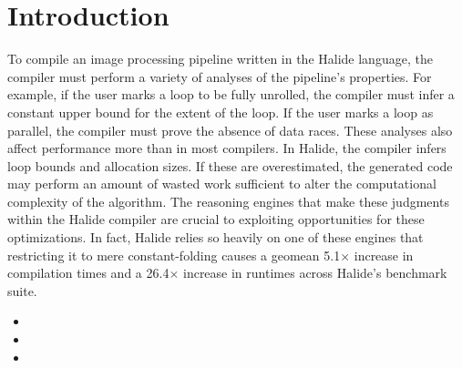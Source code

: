 \chapter{Introduction}
\label{sec:intro}


To compile an image processing pipeline written in the
  Halide language, the compiler must perform a variety of analyses of
  the pipeline's properties. For example, if the user marks a
  loop to be fully unrolled, the compiler must infer a constant upper
  bound for the extent of the loop. If the user marks
  a loop as parallel, the compiler must prove the absence of data
  races. These analyses also affect performance more than in most
  compilers. In Halide, the compiler infers loop bounds and allocation sizes.
  If these are overestimated, the generated code may
  perform an amount of wasted work sufficient to alter the
  computational complexity of the algorithm. The reasoning engines that make these judgments within the Halide compiler are crucial to exploiting opportunities for these optimizations.
  In fact, Halide relies so heavily on one of these engines that restricting it
  to mere constant-folding causes a geomean 5.1$\times$ increase in
  compilation times and a 26.4$\times$ increase in runtimes across
  Halide's benchmark suite.


\begin{itemize}
  \item {}
  \item {}
  \item {}
\end{itemize}

